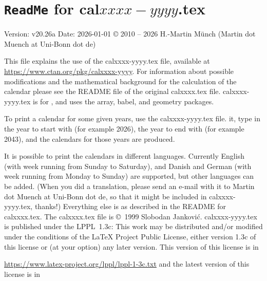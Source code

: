 \documentclass{article}[2025/01/22]%
\begin{document}
\section*{\texttt{ReadMe} for cal$xxxx-yyyy$.tex}
Version: v20.26a\newline
Date: 2026-01-01\newline
© 2010 -- 2026 H.-Martin Münch (Martin dot Muench at Uni-Bonn dot de)\newline

\noindent This file explains the use of the \textsf{calxxxx-yyyy.tex} file,
available at\newline
\url{https://www.ctan.org/pkg/calxxxx-yyyy}.\newline
\noindent For information about possible modifications and the mathematical background
for the calculation of the calendar please see the README file of the original
\textsf{calxxxx.tex} file. \textsf{calxxxx-yyyy.tex} is for \LaTeXe, and uses
the \textsf{array}, \textsf{babel}, and \textsf{geometry} packages.

\hspace*{-1.98471pt}To print a calendar for some given years,
use the \textsf{calxxxx-yyyy.tex} file. \LaTeXe{} it, type in the year to start with
(for example 2026), the year to end with (for example 2043), and the calendars
for those years are produced.

It is possible to print the calendars in different languages. Currently
English (with week running from Sunday to Saturday),
and Danish and German (with week running from Monday to Sunday) are supported,
but other languages can be added. (When you did a translation, please send
an e-mail with it to Martin dot Muench at Uni-Bonn dot de,
so that it might be included in \textsf{calxxxx-yyyy.tex}, thanks!)\newline
Everything else is as described in the README for \textsf{calxxxx.tex}.\newline
The \textsf{calxxxx.tex} file is ©~1999 Slobodan Janković.\newline
\textsf{calxxxx-yyyy.tex} is published under the LPPL~1.3c: This work may be
distributed and/or modified under the conditions of the \LaTeX{} Project
Public License, either version 1.3c of this license or (at your option) any
later version. This version of this license is in

\url{https://www.latex-project.org/lppl/lppl-1-3c.txt}\newline
and the latest version of this license is in
\end{document}
